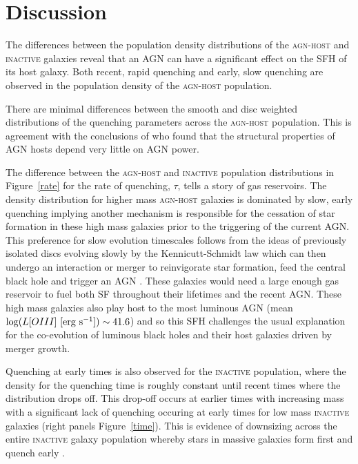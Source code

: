 \documentclass[useAMS,usenatbib]{mn2e}
\def\changed    {\color{nc} }
\def\secondchange    {\color{srv} }
\begin{document}
\section{Discussion}\label{dis}

The differences between the {\secondchange population density distributions} of the \textsc{agn-host} and \textsc{inactive} galaxies reveal that an AGN can have a significant effect on the SFH of its host galaxy. Both recent, rapid quenching and early, slow quenching are observed in the {\secondchange population density} of the \textsc{agn-host} population. 


{\changed There are minimal differences between the smooth and disc weighted distributions of the quenching parameters across the \textsc{agn-host} population. This is agreement with the conclusions of \citet*{Kauff03b} who found that the structural properties of AGN hosts depend very little on AGN power. }


The difference between the \textsc{agn-host} and \textsc{inactive} {\secondchange population distributions} in Figure~\ref{rate} for the rate of quenching, $\tau$, tells a story of gas reservoirs. The {\secondchange density distribution} for higher mass \textsc{agn-host} galaxies is dominated by slow, early quenching implying another mechanism is responsible for the cessation of star formation in these high mass galaxies prior to the triggering of the current AGN.  This preference for slow evolution timescales follows from the ideas of previously isolated discs evolving slowly by the Kennicutt-Schmidt \citep{Schmidt59, Kennicutt97} law which can then undergo an interaction or merger to reinvigorate star formation, feed the central black hole and trigger an AGN \citep{Varela04, Em15}. These galaxies would need a large enough gas reservoir to fuel both SF throughout their lifetimes and the recent AGN. These high mass galaxies also play host to the most luminous AGN (mean $\log (L[OIII] ~[\rm{erg}~s^{-1}]) \sim 41.6$) and so this SFH challenges the usual explanation for the co-evolution of luminous black holes and their host galaxies driven by merger growth. 



Quenching at early times is also observed for the \textsc{inactive} population, where the {\secondchange density} for the quenching time is roughly constant until recent times where the distribution drops off. {\changed This drop-off occurs at earlier times with increasing mass with a significant lack of quenching occuring at early times for low mass \textsc{inactive} galaxies} (right panels Figure~\ref{time}). This is evidence of downsizing across the entire \textsc{inactive} galaxy population whereby stars in massive galaxies form first and quench early \citep{Cowie96, Thomas10}. 
\end{document}
